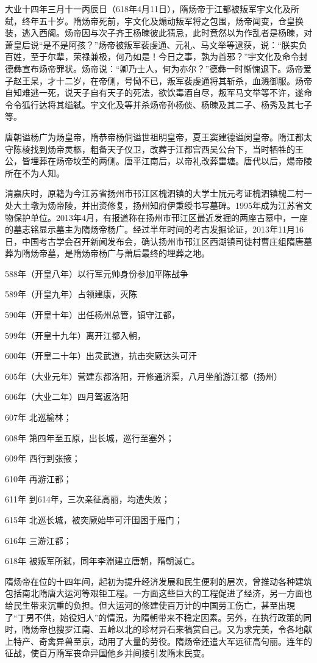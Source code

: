 大业十四年三月十一丙辰日（618年4月11日），隋炀帝于江都被叛军宇文化及所弑，终年五十岁。隋炀帝死前，宇文化及煽动叛军将之包围，炀帝闻变，仓皇换装，逃入西阁。炀帝因与次子齐王杨暕彼此猜忌，此时竟然以为作乱者是杨暕，对萧皇后说“是不是阿孩？”炀帝被叛军裴虔通、元礼、马文举等逮获，说：“朕实负百姓，至于尔辈，荣禄兼极，何乃如是！今日之事，孰为首邪？”宇文化及命令封德彝宣布炀帝罪状。炀帝说：“卿乃士人，何为亦尔？”德彝一时惭愧退下。炀帝爱子赵王杲，才十二岁，在帝侧，号恸不已，叛军裴虔通将其斩杀，血溅御服。炀帝自知难逃一死，说天子自有天子的死法，欲饮毒酒自尽，叛军马文举等不许，遂命令令狐行达将其缢弑。宇文化及等并杀炀帝孙杨倓、杨暕及其二子、杨秀及其七子等。

唐朝谥杨广为炀皇帝，隋恭帝杨侗谥世祖明皇帝，夏王窦建德谥闵皇帝。隋江都太守陈棱找到炀帝灵柩，粗备天子仪卫，改葬于江都宫西吴公台下，当时牺牲的王公，皆埋葬在炀帝坟茔的两侧。唐平江南后，以帝礼改葬雷塘。唐代以后，煬帝陵所在不为人知。

清嘉庆时，原籍为今江苏省扬州市邗江区槐泗镇的大学士阮元考证槐泗镇槐二村一处大土墩为炀帝陵，并出资修复，扬州知府伊秉绶书写墓碑。1995年成为江苏省文物保护单位。2013年4月，有报道称在扬州市邗江区最近发掘的两座古墓中，一座的墓志铭显示墓主为隋炀帝杨广。经过半年时间的考古发掘论证，2013年11月16日，中国考古学会召开新闻发布会，确认扬州市邗江区西湖镇司徒村曹庄组隋唐墓葬为隋炀帝墓，是隋炀帝杨广与萧后最终的埋葬之地。

588年（开皇八年）以行军元帅身份参加平陈战争

589年（开皇九年）占领建康，灭陈

590年（开皇十年）出任杨州总管，镇守江都，

599年（开皇十九年）离开江都入朝，

600年（开皇二十年）出灵武道，抗击突厥达头可汗

605年（大业元年）营建东都洛阳，开修通济渠，八月坐船游江都（扬州）

606年（大业二年）四月驾返洛阳

607年 北巡榆林；

608年 第四年至五原，出长城，巡行至塞外；

609年 西行到张掖；

610年 再游江都；

611年 到614年，三次亲征高丽，均遭失败；

615年 北巡长城，被突厥始毕可汗围困于雁门；

616年 三游江都；

618年 被叛军所弑，同年李淵建立唐朝，隋朝滅亡。

隋炀帝在位的十四年间，起初为提升经济发展和民生便利的层次，曾推动各种建筑包括南北隋唐大运河等艰钜工程。一方面这些巨大的工程促进了经济，另一方面也给民生带来沉重的负担。但大运河的修建使百万计的中国劳工伤亡，甚至出現了“丁男不供，始役妇人”的情況，为隋朝带来不稳定因素。另外，在执行政策的同时，隋炀帝也搜罗江南、五岭以北的珍材异石来犒赏自己。又为求完美，令各地献上特产、奇禽异兽至京，动用了大量的劳役。隋炀帝还遣大军远征高句丽。连年的征战，使百万隋军丧命异国他乡并间接引发隋末民变。


